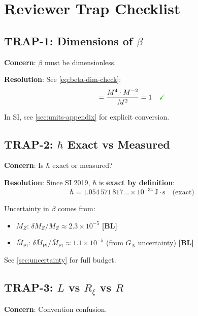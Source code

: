 \documentclass[11pt,a4paper]{article}
\newcommand{\Mpl}{\bar{M}_{\mathrm{Pl}}}
\newcommand{\Rxi}{R_\xi}
\newcommand{\MZ}{M_Z}
\newcommand{\tagBL}{\textbf{[BL]}}
\newcommand{\emark}{\textcolor{green!70!black}{\checkmark}}
\theoremstyle{definition}
\theoremstyle{plain}
\theoremstyle{remark}
\begin{document}
\section{Reviewer Trap Checklist}
\label{sec:traps}

\subsection{TRAP-1: Dimensions of $\beta$}
\label{sec:trap1}

\textbf{Concern}: $\beta$ must be dimensionless.

\textbf{Resolution}: See \cref{eq:beta-dim-check}:
\begin{equation}
[\beta] = \frac{M^4 \cdot M^{-2}}{M^2} = 1 \quad \emark
\end{equation}

In SI, see \cref{sec:units-appendix} for explicit conversion.

\subsection{TRAP-2: $\hbar$ Exact vs Measured}
\label{sec:trap2}

\textbf{Concern}: Is $\hbar$ exact or measured?

\textbf{Resolution}: Since SI 2019, $\hbar$ is \textbf{exact by definition}:
\begin{equation}
\hbar = 1.054\,571\,817... \times 10^{-34}\,\text{J}\cdot\text{s} \quad \text{(exact)}
\label{eq:hbar-exact}
\end{equation}

Uncertainty in $\beta$ comes from:
\begin{itemize}
\item $\MZ$: $\delta\MZ/\MZ \approx 2.3 \times 10^{-5}$ \tagBL{}
\item $\Mpl$: $\delta\Mpl/\Mpl \approx 1.1 \times 10^{-5}$ (from $G_N$ uncertainty) \tagBL{}
\end{itemize}

See \cref{sec:uncertainty} for full budget.

\subsection{TRAP-3: $L$ vs $\Rxi$ vs $R$}
\label{sec:trap3}

\textbf{Concern}: Convention confusion.
\end{document}
